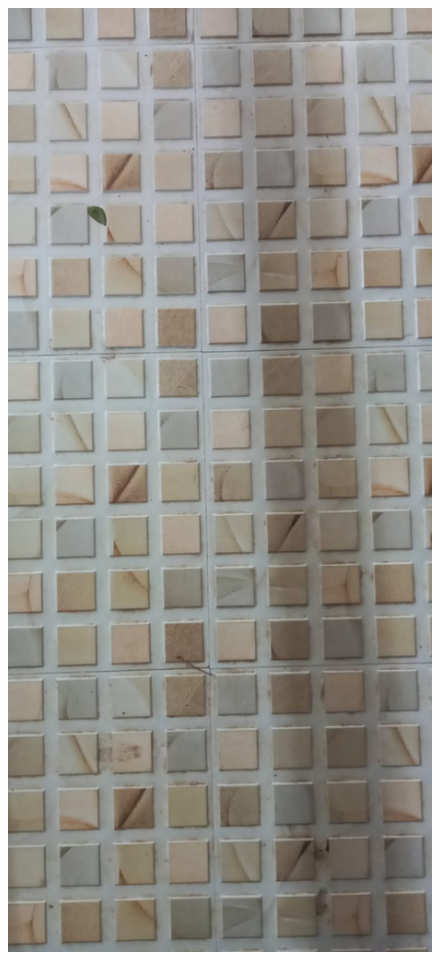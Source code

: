 \documentclass{beamer}
\begin{document}
\begin{frame}
    \begin{figure}
        \includegraphics[height=0.5\textheight]{corridor1}

\end{figure}
\end{frame}
\end{document}
